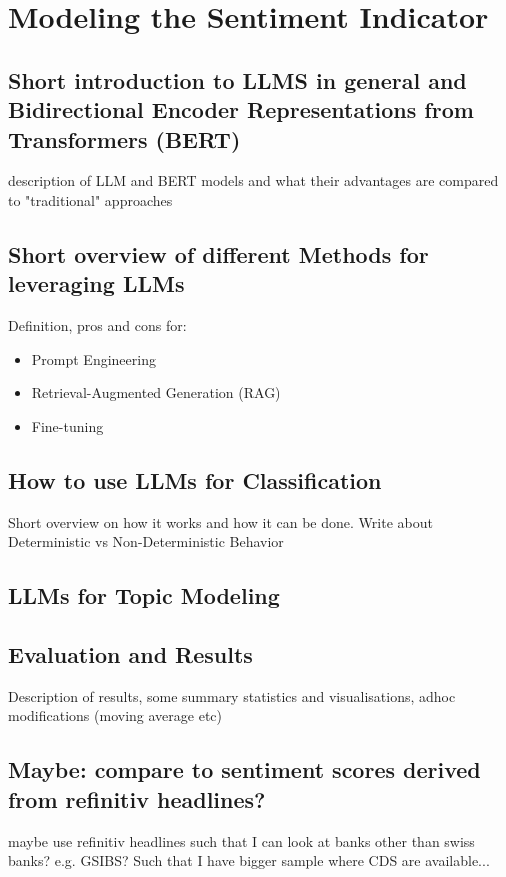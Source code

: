 \chapter{Modeling the Sentiment Indicator}\label{sec5}
\thispagestyle{empty}

\section{Short introduction to LLMS in general and Bidirectional Encoder Representations from Transformers (BERT)}

description of LLM and BERT models and what their advantages are compared to "traditional" approaches

\section{Short overview of different Methods for leveraging LLMs}

Definition, pros and cons for:

\begin{itemize}
	\item Prompt Engineering
	\item Retrieval-Augmented Generation (RAG)
	\item Fine-tuning
\end{itemize}

\section{How to use LLMs for Classification}

Short overview on how it works and how it can be done. Write about Deterministic vs Non-Deterministic Behavior

\section{LLMs for Topic Modeling}

\section{Evaluation and Results}

Description of results, some summary statistics and visualisations, adhoc modifications (moving average etc)

\section{Maybe: compare to sentiment scores derived from refinitiv headlines?}

maybe use refinitiv headlines such that I can look at banks other than swiss banks? e.g. GSIBS? Such that I have bigger sample where CDS are available...







\cleardoublepage

